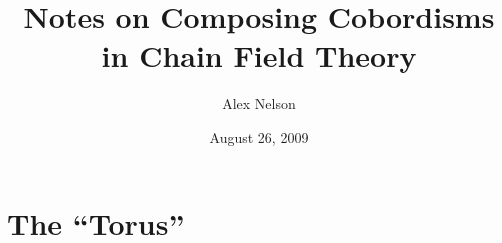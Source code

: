 \documentclass{amsart}
\title{Notes on Composing Cobordisms in Chain Field Theory}
\date{August 26, 2009}
\author{Alex Nelson}
\numberwithin{equation}{section}
\begin{document}
\maketitle
\section{The ``Torus''}


\nocite{*}


\end{document}
